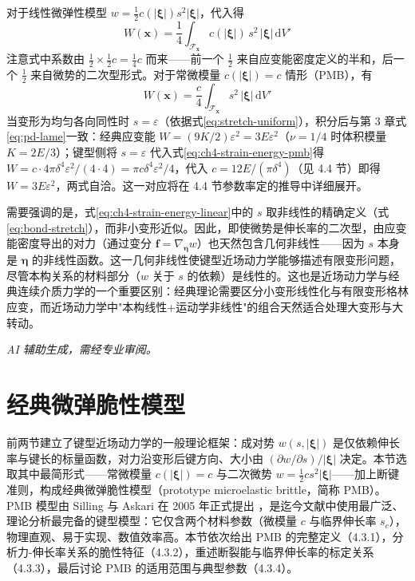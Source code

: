 对于线性微弹性模型 $w=\tfrac{1}{2}c(|\boldsymbol{\xi}|)s^{2}|\boldsymbol{\xi}|$，代入得
\begin{equation}
W(\mathbf{x}) = \frac{1}{4}\int_{\mathcal{F}_{\mathbf{x}}} c(|\boldsymbol{\xi}|)\,s^{2}\,|\boldsymbol{\xi}|\,\mathrm{d}V'
\label{eq:ch4-strain-energy-linear}
\end{equation}
注意式中系数由 $\tfrac{1}{2}\times\tfrac{1}{2}c=\tfrac{1}{4}c$ 而来——前一个 $\tfrac{1}{2}$ 来自应变能密度定义的半和，后一个 $\tfrac{1}{2}$ 来自微势的二次型形式。对于常微模量 $c(|\boldsymbol{\xi}|)=c$ 情形（PMB），有
\begin{equation}
W(\mathbf{x}) = \frac{c}{4}\int_{\mathcal{F}_{\mathbf{x}}} s^{2}\,|\boldsymbol{\xi}|\,\mathrm{d}V'
\label{eq:ch4-strain-energy-pmb}
\end{equation}
当变形为均匀各向同性时 $s=\varepsilon$（依据式\eqref{eq:stretch-uniform}），积分后与第 3 章式\eqref{eq:pd-lame}一致：经典应变能 $W=(9K/2)\varepsilon^{2}=3E\varepsilon^{2}$（$\nu=1/4$ 时体积模量 $K=2E/3$）；键型侧将 $s=\varepsilon$ 代入式\eqref{eq:ch4-strain-energy-pmb}得 $W=c\cdot4\pi\delta^{4}\varepsilon^{2}/(4\cdot4)=\pi c\delta^{4}\varepsilon^{2}/4$，代入 $c=12E/(\pi\delta^{4})$（见 4.4 节）即得 $W=3E\varepsilon^{2}$，两式自洽。这一对应将在 4.4 节参数率定的推导中详细展开。

需要强调的是，式\eqref{eq:ch4-strain-energy-linear}中的 $s$ 取非线性的精确定义（式\eqref{eq:bond-stretch}），而非小变形近似。因此，即使微势是伸长率的二次型，由应变能密度导出的对力（通过变分 $\mathbf{f}=\nabla_{\boldsymbol{\eta}}w$）也天然包含几何非线性——因为 $s$ 本身是 $\boldsymbol{\eta}$ 的非线性函数。这一几何非线性使键型近场动力学能够描述有限变形问题，尽管本构关系的材料部分（$w$ 关于 $s$ 的依赖）是线性的。这也是近场动力学与经典连续介质力学的一个重要区别：经典理论需要区分小变形线性化与有限变形格林应变，而近场动力学中"本构线性+运动学非线性"的组合天然适合处理大变形与大转动。

\emph{AI 辅助生成，需经专业审阅。}

\section{经典微弹脆性模型}

前两节建立了键型近场动力学的一般理论框架：成对势 $w(s,|\boldsymbol{\xi}|)$ 是仅依赖伸长率与键长的标量函数，对力沿变形后键方向、大小由 $(\partial w/\partial s)/|\boldsymbol{\xi}|$ 决定。本节选取其中最简形式——常微模量 $c(|\boldsymbol{\xi}|)=c$ 与二次微势 $w=\tfrac{1}{2}c s^{2}|\boldsymbol{\xi}|$——加上断键准则，构成经典微弹脆性模型（prototype microelastic brittle，简称 PMB）。PMB 模型由 Silling 与 Askari 在 2005 年正式提出 \cite{SillingAskari2005}，是迄今文献中使用最广泛、理论分析最完备的键型模型：它仅含两个材料参数（微模量 $c$ 与临界伸长率 $s_c$），物理直观、易于实现、数值效率高。本节依次给出 PMB 的完整定义（4.3.1），分析力-伸长率关系的脆性特征（4.3.2），重述断裂能与临界伸长率的标定关系（4.3.3），最后讨论 PMB 的适用范围与典型参数（4.3.4）。

